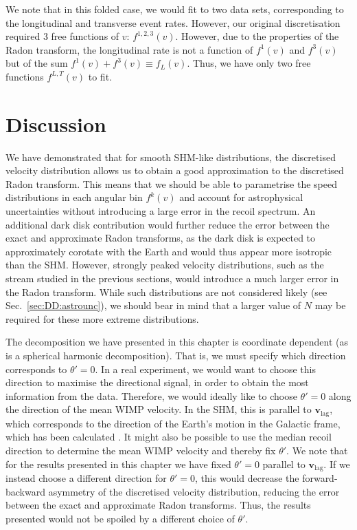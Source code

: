 We note that in this folded case, we would fit to two data sets, corresponding to the longitudinal and transverse event rates. However, our original discretisation required 3 free functions of $v$: $f^{1,2,3}(v)$. However, due to the properties of the Radon transform, the longitudinal rate is not a function of $f^1(v)$ and $f^3(v)$ but of the sum $f^1(v) + f^3(v) \equiv f_L(v)$. Thus, we have only two free functions $f^{L,T}(v)$ to fit. 


\section{Discussion}

We have demonstrated that for smooth SHM-like distributions, the discretised velocity distribution allows us to obtain a good approximation to the discretised Radon transform. This means that we should be able to parametrise the speed distributions in each angular bin $f^k(v)$ and account for astrophysical uncertainties without introducing a large error in the recoil spectrum. 
An additional dark disk contribution would further reduce the error between the exact and approximate Radon transforms, as the dark disk is expected to approximately corotate with the Earth and would thus appear more isotropic than the SHM. However, strongly peaked velocity distributions, such as the stream studied in the previous sections, would introduce a much larger error in the Radon transform. While such distributions are not considered likely (see Sec.~\ref{sec:DD:astrounc}), we should bear in mind that a larger value of $N$ may be required for these more extreme distributions.

The decomposition we have presented in this chapter is coordinate dependent (as is a spherical harmonic decomposition). That is, we must specify which direction corresponds to $\theta' = 0$. In a real experiment, we would want to choose this direction to maximise the directional signal, in order to obtain the most information from the data. Therefore, we would ideally like to choose $\theta' = 0$ along the direction of the mean WIMP velocity. In the SHM, this is parallel to $\mathbf{v}_\textrm{lag}$, which corresponds to the direction of the Earth's motion in the Galactic frame, which has been calculated \cite{McCabe:2014}. It might also be possible to use the median recoil direction to determine the mean WIMP velocity and thereby fix $\theta'$. We note that for the results presented in this chapter we have fixed $\theta' = 0$ parallel to $\mathbf{v}_\textrm{lag}$. If we instead choose a different direction for $\theta'= 0$, this would decrease the forward-backward asymmetry of the discretised velocity distribution, reducing the error between the exact and approximate Radon transforms. Thus, the results presented would not be spoiled by a different choice of $\theta'$.

